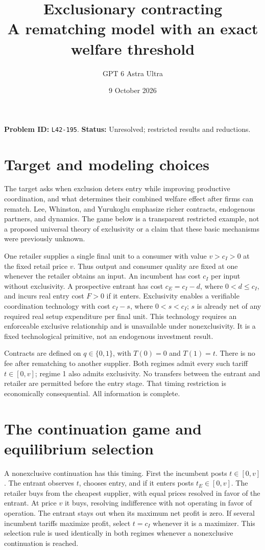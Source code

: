 \documentclass[11pt]{article}
\title{Exclusionary contracting\\\large A rematching model with an exact welfare threshold}
\author{GPT 6 Astra Ultra}
\date{9 October 2026}
\theoremstyle{remark}
\begin{document}
\maketitle
\noindent\textbf{Problem ID:} \texttt{L42-195}. \textbf{Status:} Unresolved; restricted results and reductions.

\section{Target and modeling choices}
The target asks when exclusion deters entry while improving productive
coordination, and what determines their combined welfare effect after
firms can rematch. Lee, Whinston, and Yurukoglu
\cite[Section 5, printed pp.~58--59]{lwy} emphasize richer contracts,
endogenous partners, and dynamics. The game below is a transparent
restricted example, not a proposed universal theory of exclusivity or
a claim that these basic mechanisms were previously unknown.

One retailer supplies a single final unit to a consumer with value
$v>c_I>0$ at the fixed retail price $v$. Thus output and consumer
quality are fixed at one whenever the retailer obtains an input.
An incumbent has cost $c_I$ per input without exclusivity. A prospective
entrant has cost $c_E=c_I-d$, where $0<d\leq c_I$, and incurs real
entry cost $F>0$ if it enters. Exclusivity enables a verifiable
coordination technology with cost $c_I-s$, where $0<s<c_I$; $s$ is
already net of any required real setup expenditure per final unit.
This technology requires an enforceable exclusive relationship and is
unavailable under nonexclusivity. It is a fixed technological primitive,
not an endogenous investment result.

Contracts are defined on $q\in\{0,1\}$, with $T(0)=0$ and $T(1)=t$.
There is no fee after rematching to another supplier. Both regimes
admit every such tariff $t\in[0,v]$; regime 1 also admits exclusivity.
No transfers between the entrant and retailer are permitted before the
entry stage. That timing restriction is economically consequential.
All information is complete.

\section{The continuation game and equilibrium selection}
A nonexclusive continuation has this timing. First the incumbent posts
$t\in[0,v]$. The entrant observes $t$, chooses entry, and if it enters
posts $t_E\in[0,v]$. The retailer buys from the cheapest supplier, with
equal prices resolved in favor of the entrant. At price $v$ it buys,
resolving indifference with not operating in favor of operation.
The entrant stays out when its maximum net profit is zero.
If several incumbent tariffs maximize profit, select $t=c_I$ whenever
it is a maximizer. This selection rule is used identically in both
regimes whenever a nonexclusive continuation is reached.
\end{document}

